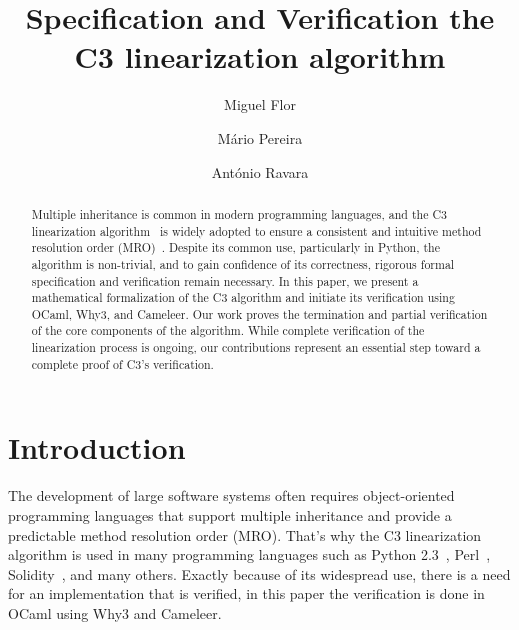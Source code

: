 \documentclass[runningheads]{llncs}
\title{Specification and Verification the\\ C3 linearization algorithm}
\author{
  Miguel Flor \and Mário Pereira \and António Ravara
}
\institute{
  NOVA LINCS, Nova School of Science and Technology \\
  \email{m.flor@campus.fct.unl.pt}, \email{\{mjp.pereira, aravara\}@fct.unl.pt}
}
\begin{document}
\maketitle

\begin{abstract}
Multiple inheritance is common in modern programming languages,
 and the C3 linearization algorithm~\autocite{barrettMonotonicSuperclassLinearization1996} is widely adopted to ensure a consistent and intuitive method resolution order (MRO)~\autocite{MroMethodResolution}. Despite its common use, particularly in Python, the algorithm is non-trivial, and to gain confidence of its correctness, rigorous formal specification and verification remain necessary.
In this paper, we present a mathematical formalization of the C3 algorithm and initiate its verification using OCaml, Why3, and Cameleer. Our work proves the termination and partial verification of the core components of the algorithm.
While complete verification of the linearization process is ongoing, our contributions represent an essential step toward a complete proof of C3's verification.
\end{abstract}
\section{Introduction}
The development of large software systems often requires object-oriented programming languages that support multiple inheritance and provide a predictable method resolution order (MRO). 
 That's why the C3 linearization algorithm is used in many programming languages such as Python 2.3~\autocite{Python23Method}, Perl~\autocite{MroMethodResolution}, Solidity~\autocite{LanguageInfluencesSolidity}, and many others.
 Exactly because of its widespread use, there is a need for an implementation that is verified, in this paper the verification is done in OCaml using Why3 and Cameleer.
\end{document}
